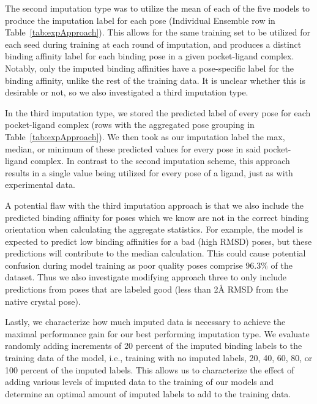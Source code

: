\documentclass[journal=jcim,manuscript=article]{achemso}
\begin{document}
The second imputation type was to utilize the mean of each of the five models to produce the imputation label for each pose (Individual Ensemble row in Table~\ref{tab:expApproach}).
This allows for the same training set to be utilized for each seed during training at each round of imputation, and produces a distinct binding affinity label for each binding pose in a given pocket-ligand complex.
Notably, only the imputed binding affinities have a pose-specific label for the binding affinity, unlike the rest of the training data.
It is unclear whether this is desirable or not, so we also investigated a third imputation type.

In the third imputation type, we stored the predicted label of every pose for each pocket-ligand complex (rows with the aggregated pose grouping in Table~\ref{tab:expApproach}).
We then took as our imputation label the max, median, or minimum of these predicted values for every pose in said pocket-ligand complex.
In contrast to the second imputation scheme, this approach results in a single value being utilized for every pose of a ligand, just as with experimental data.

A potential flaw with the third imputation approach is that we also include the predicted binding affinity for poses which we know are not in the correct binding orientation when calculating the aggregate statistics.  For example, the model is expected to predict low binding affinities for a bad (high RMSD) poses, but these predictions will contribute to the median calculation.
This could cause potential confusion during model training as poor quality poses  comprise 96.3\% of the dataset.
Thus we also investigate modifying approach three to only include predictions from poses that are labeled good (less than 2{\AA} RMSD from the native crystal pose).

Lastly, we characterize how much imputed data is necessary to achieve the maximal performance gain for our best performing imputation type.
We evaluate randomly adding increments of 20 percent of the imputed binding labels to the training data of the model, i.e., training with no imputed labels, 20, 40, 60, 80, or 100 percent of the imputed labels.
This allows us to characterize the effect of adding various levels of imputed data to the training of our models and determine an optimal amount of imputed labels to add to the training data.
\end{document}
